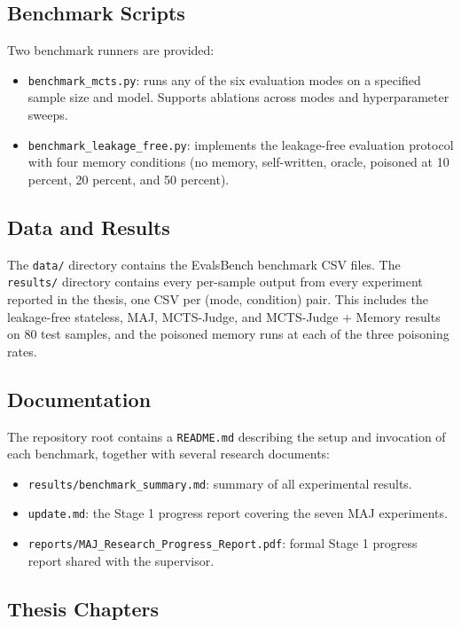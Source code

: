 \documentclass[12pt,a4paper]{article}
\begin{document}
\subsection{Benchmark Scripts}

Two benchmark runners are provided:

\begin{itemize}
    \item \texttt{benchmark\_mcts.py}: runs any of the six evaluation modes on a specified sample size and model. Supports ablations across modes and hyperparameter sweeps.
    \item \texttt{benchmark\_leakage\_free.py}: implements the leakage-free evaluation protocol with four memory conditions (no memory, self-written, oracle, poisoned at 10 percent, 20 percent, and 50 percent).
\end{itemize}

\subsection{Data and Results}

The \texttt{data/} directory contains the EvalsBench benchmark CSV files. The \texttt{results/} directory contains every per-sample output from every experiment reported in the thesis, one CSV per (mode, condition) pair. This includes the leakage-free stateless, MAJ, MCTS-Judge, and MCTS-Judge + Memory results on 80 test samples, and the poisoned memory runs at each of the three poisoning rates.

\subsection{Documentation}

The repository root contains a \texttt{README.md} describing the setup and invocation of each benchmark, together with several research documents:

\begin{itemize}
    \item \texttt{results/benchmark\_summary.md}: summary of all experimental results.
    \item \texttt{update.md}: the Stage 1 progress report covering the seven MAJ experiments.
    \item \texttt{reports/MAJ\_Research\_Progress\_Report.pdf}: formal Stage 1 progress report shared with the supervisor.
\end{itemize}

\subsection{Thesis Chapters}
\end{document}
